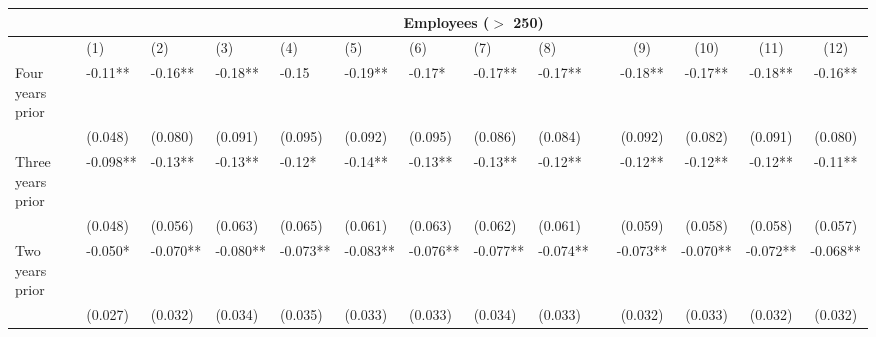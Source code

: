 \begin{tabular}{lccccrrrrrcccc}
\toprule
      & \multicolumn{13}{c}{Employees ($>$ 250)} \\
\midrule
      & \multicolumn{1}{l}{(1)} & \multicolumn{1}{l}{(2)} & \multicolumn{1}{l}{(3)} & \multicolumn{1}{l}{(4)} & \multicolumn{1}{l}{(5)} & \multicolumn{1}{l}{(6)} & \multicolumn{1}{l}{(7)} & \multicolumn{1}{l}{(8)} &       & (9)   & (10)  & (11)  & (12) \\
\midrule
\midrule
Four years prior & \multicolumn{1}{l}{-0.11**} & \multicolumn{1}{l}{-0.16**} & \multicolumn{1}{l}{-0.18**} & \multicolumn{1}{l}{-0.15} & \multicolumn{1}{l}{-0.19**} & \multicolumn{1}{l}{-0.17*} & \multicolumn{1}{l}{-0.17**} & \multicolumn{1}{l}{-0.17**} &       & -0.18** & -0.17** & -0.18** & -0.16** \\
      & \multicolumn{1}{l}{(0.048)} & \multicolumn{1}{l}{(0.080)} & \multicolumn{1}{l}{(0.091)} & \multicolumn{1}{l}{(0.095)} & \multicolumn{1}{l}{(0.092)} & \multicolumn{1}{l}{(0.095)} & \multicolumn{1}{l}{(0.086)} & \multicolumn{1}{l}{(0.084)} &       & (0.092) & (0.082) & (0.091) & (0.080) \\
Three years prior & \multicolumn{1}{l}{-0.098**} & \multicolumn{1}{l}{-0.13**} & \multicolumn{1}{l}{-0.13**} & \multicolumn{1}{l}{-0.12*} & \multicolumn{1}{l}{-0.14**} & \multicolumn{1}{l}{-0.13**} & \multicolumn{1}{l}{-0.13**} & \multicolumn{1}{l}{-0.12**} &       & -0.12** & -0.12** & -0.12** & -0.11** \\
      & \multicolumn{1}{l}{(0.048)} & \multicolumn{1}{l}{(0.056)} & \multicolumn{1}{l}{(0.063)} & \multicolumn{1}{l}{(0.065)} & \multicolumn{1}{l}{(0.061)} & \multicolumn{1}{l}{(0.063)} & \multicolumn{1}{l}{(0.062)} & \multicolumn{1}{l}{(0.061)} &       & (0.059) & (0.058) & (0.058) & (0.057) \\
Two years prior & \multicolumn{1}{l}{-0.050*} & \multicolumn{1}{l}{-0.070**} & \multicolumn{1}{l}{-0.080**} & \multicolumn{1}{l}{-0.073**} & \multicolumn{1}{l}{-0.083**} & \multicolumn{1}{l}{-0.076**} & \multicolumn{1}{l}{-0.077**} & \multicolumn{1}{l}{-0.074**} &       & -0.073** & -0.070** & -0.072** & -0.068** \\
      & \multicolumn{1}{l}{(0.027)} & \multicolumn{1}{l}{(0.032)} & \multicolumn{1}{l}{(0.034)} & \multicolumn{1}{l}{(0.035)} & \multicolumn{1}{l}{(0.033)} & \multicolumn{1}{l}{(0.033)} & \multicolumn{1}{l}{(0.034)} & \multicolumn{1}{l}{(0.033)} &       & (0.032) & (0.033) & (0.032) & (0.032) \\

\end{tabular}
